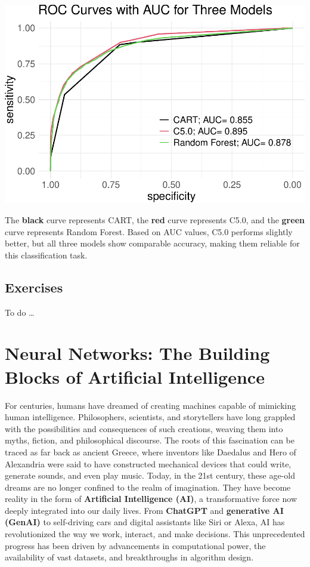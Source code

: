 \documentclass[
]{book}
\theoremstyle{definition}
\theoremstyle{definition}
\theoremstyle{definition}
\theoremstyle{definition}
\theoremstyle{remark}
\begin{document}
\begin{center}\includegraphics[width=0.7\linewidth]{tree_files/figure-latex/unnamed-chunk-14-1} \end{center}

The \textbf{black} curve represents CART, the {\textbf{red}} curve represents C5.0, and the {\textbf{green}} curve represents Random Forest. Based on AUC values, C5.0 performs slightly better, but all three models show comparable accuracy, making them reliable for this classification task.

\section{Exercises}\label{exercises-9}

To do \ldots{}

\chapter{Neural Networks: The Building Blocks of Artificial Intelligence}\label{chapter-nn}

For centuries, humans have dreamed of creating machines capable of mimicking human intelligence. Philosophers, scientists, and storytellers have long grappled with the possibilities and consequences of such creations, weaving them into myths, fiction, and philosophical discourse. The roots of this fascination can be traced as far back as ancient Greece, where inventors like Daedalus and Hero of Alexandria were said to have constructed mechanical devices that could write, generate sounds, and even play music. Today, in the 21st century, these age-old dreams are no longer confined to the realm of imagination. They have become reality in the form of \textbf{Artificial Intelligence (AI)}, a transformative force now deeply integrated into our daily lives. From \textbf{ChatGPT} and \textbf{generative AI (GenAI)} to self-driving cars and digital assistants like Siri or Alexa, AI has revolutionized the way we work, interact, and make decisions. This unprecedented progress has been driven by advancements in computational power, the availability of vast datasets, and breakthroughs in algorithm design.
\end{document}
